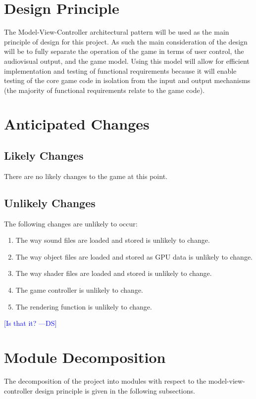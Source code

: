 \documentclass[12pt, titlepage]{article}
\newcommand{\authornote}[3]{\textcolor{#1}{[#3 ---#2]}}
\newcommand{\authornote}[3]{}
\newcommand{\ds}[1]{\authornote{blue}{DS}{#1}}
\begin{document}
\section{Design Principle}
The Model-View-Controller architectural pattern will be used as the main principle of design for this project.  As such the main consideration of the design will be to fully separate the operation of the game in terms of user control, the audiovisual output, and the game model.  Using this model will allow for efficient implementation and testing of functional requirements because it will enable testing of the core game code in isolation from the input and output mechanisms (the majority of functional requirements relate to the game code).



\section{Anticipated Changes}
\subsection{Likely Changes}
There are no likely changes to the game at this point.

\subsection{Unlikely Changes}
The following changes are unlikely to occur:
\begin{enumerate}[label=UC\arabic*]
  \item The way sound files are loaded and stored is unlikely to change.
  \item The way object files are loaded and stored as GPU data is unlikely to change.
  \item The way shader files are loaded and stored is unlikely to change.
  \item The game controller is unlikely to change.
  \item The rendering function is unlikely to change.
\end{enumerate}

\ds{Is that it?}

\section{Module Decomposition}
The decomposition of the project into modules with respect to the model-view-controller design principle is given in the following subsections.
\end{document}
